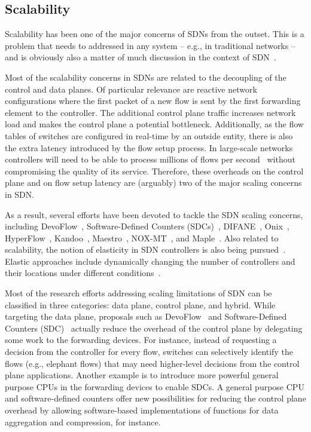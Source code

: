 \subsection{Scalability}
\label{sec:scaling}

Scalability has been one of the major concerns of SDNs from the outset.
This is a problem that needs to addressed in any system -- e.g., in traditional networks -- and is obviously also a matter of much discussion in the context of SDN~\cite{yeganeh2013}.

Most of the scalability concerns in SDNs are related to the decoupling of the control and data planes. 
Of particular relevance are reactive network configurations where the first packet of a new flow is sent by the first forwarding element to the controller.
The additional control plane traffic increases network load and makes the control plane a potential bottleneck. 
Additionally, as the flow tables of switches are configured in real-time by an outside 
entity, there is also the extra latency introduced by the flow setup process.
In large-scale networks controllers will need to be able to process millions of flows per second~\cite{Benson2010DC} without compromising the quality of its service.
Therefore, these overheads on the control plane and on flow setup latency are (arguably) two of the major scaling concerns in SDN.

As a result, several efforts have been devoted to tackle the SDN scaling concerns, including
DevoFlow~\cite{curtis2011}, 
Software-Defined Counters (SDCs)~\cite{mogul2012},
DIFANE~\cite{yu2010-1},
Onix~\cite{koponen-1}, 
HyperFlow~\cite{tootoonchian2010},
Kandoo~\cite{yeganeh2012},
Maestro~\cite{cai2011},
NOX-MT~\cite{tootoonchian2012}, and 
Maple~\cite{voellmy2013}. 
Also related to scalability, the notion of elasticity in SDN controllers is also being pursued~\cite{dixit2013}.
Elastic approaches include dynamically changing 
the number of controllers and their locations under different conditions~\cite{bari2013-1}.

Most of the research efforts addressing scaling limitations of SDN can be classified in three categories: data 
plane, control plane, and hybrid.
While targeting the data plane, proposals such as 
DevoFlow~\cite{curtis2011} and Software-Defined Counters 
(SDC)~\cite{mogul2012} actually reduce the overhead of the control plane by delegating some work to the forwarding devices.
For instance, instead of requesting a decision from the
controller for every flow, switches can selectively identify the flows (e.g., elephant flows) that may need higher-level decisions from the control plane applications.
Another example is to introduce 
more powerful general purpose CPUs in the forwarding devices to enable SDCs. 
A general purpose CPU and software-defined counters offer new possibilities for reducing the control plane overhead by allowing 
software-based implementations of functions for data aggregation and compression, for instance.

